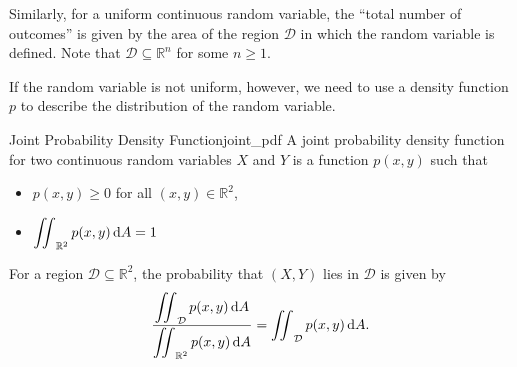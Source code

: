 Similarly, for a uniform continuous random variable, the ``total number of outcomes'' is given by the area of the region $\mathcal{D}$ in which the random variable is defined.
Note that $\mathcal{D} \subseteq \mathbb{R}^n$ for some $n \geq 1$.

If the random variable is not uniform, however, we need to use a density function $p$ to describe the distribution of the random variable.

\begin{definition}{Joint Probability Density Function}{joint_pdf}
A joint probability density function for two continuous random variables $X$ and $Y$ is a function $p(x, y)$ such that
\begin{itemize}
    \item $p(x, y) \geq 0$ for all $(x, y) \in \mathbb{R}^2$,
    \item $\displaystyle\mathop{\int\mkern-10mu\int}\nolimits_{\mathbb{R}^2} p(x, y) \, \mathrm{d}A = 1$
\end{itemize}

For a region $\mathcal{D} \subseteq \mathbb{R}^2$, the probability that $(X, Y)$ lies in $\mathcal{D}$ is given by
\[ 
    \frac{\displaystyle\mathop{\int\mkern-10mu\int}\nolimits_{\mathcal{D}} p(x, y) \, \mathrm{d}A}{\displaystyle\mathop{\int\mkern-10mu\int}\nolimits_{\mathbb{R}^2} p(x, y) \, \mathrm{d}A} = \mathop{\int\mkern-10mu\int}\nolimits_{\mathcal{D}} p(x, y) \, \mathrm{d}A.
\]
\end{definition}